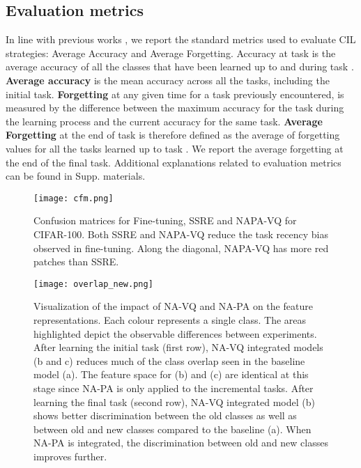 \documentclass[10pt,twocolumn,letterpaper]{article}
\begin{document}
\subsection{Evaluation metrics}
In line with previous works \cite{Zhu2021PrototypeLearning,Zhu2022Self-SustainingLearning}, we report the standard metrics used to evaluate CIL strategies: Average Accuracy and Average Forgetting. Accuracy at task  is the average accuracy of all the classes that have been learned up to and during task . 
\textbf{Average accuracy} \cite{Chaudhry2018RiemannianIntransigence} is the mean accuracy across all the tasks, including the initial task. \textbf{Forgetting} at any given time for a task previously encountered, is measured by the difference between the maximum accuracy for the task during the learning process and the current accuracy for the same task. \textbf{Average Forgetting} at the end of task  is therefore defined as the average of forgetting values for all the tasks learned up to task  \cite{Chaudhry2018RiemannianIntransigence}. 
We report the average forgetting at the end of the final task. Additional explanations related to evaluation metrics can be found in Supp. materials.

\begin{figure}[t]
\centering
\texttt{[image: cfm.png]}
\caption{Confusion matrices for Fine-tuning, SSRE and NAPA-VQ for CIFAR-100. Both SSRE and NAPA-VQ reduce the task recency bias observed in fine-tuning. Along the diagonal, NAPA-VQ has more red patches than SSRE.}
\label{fig:cfm}
\end{figure}

\begin{figure*}[t]
\centering
\texttt{[image: overlap\_new.png]}
\caption{Visualization of the impact of NA-VQ and NA-PA on the feature representations. Each colour represents a single class. The areas highlighted depict the observable differences between experiments. After learning the initial task (first row), NA-VQ integrated models (b and c) reduces much of the class overlap seen in the baseline model (a). The feature space for (b) and (c) are identical at this stage since NA-PA is only applied to the incremental tasks. After learning the final task (second row), NA-VQ integrated model (b) shows better discrimination between the old classes as well as between old and new classes compared to the baseline (a). When NA-PA is integrated, the discrimination between old and new classes improves further. 
}
\label{fig:overlap}
\end{figure*} 
\end{document}
